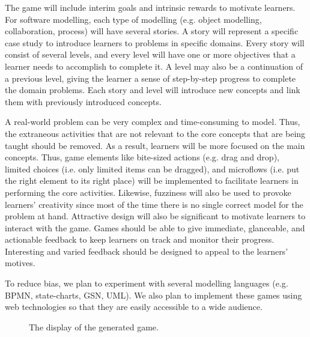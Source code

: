 \documentclass[12pt, a4paper]{report}
\begin{document}
The game will include interim goals and intrinsic rewards to motivate learners. For software modelling, each type of modelling (e.g. object modelling, collaboration, process) will have several stories. A story will represent a specific case study to introduce learners to problems in specific domains. Every story will consist of several levels, and every level will have one or more objectives that a learner needs to accomplish to complete it. A level may also be a continuation of a previous level, giving the learner a sense of step-by-step progress to complete the domain problems. Each story and level will introduce new concepts and link them with previously introduced concepts.

A real-world problem can be very complex and time-consuming to model. Thus, the extraneous activities that are not relevant to the core concepts that are being taught should be removed. As a result, learners will be more focused on the main concepts. Thus, game elements like bite-sized actions (e.g. drag and drop), limited choices (i.e. only limited items can be dragged), and microflows (i.e. put the right element to its right place) will be implemented to facilitate learners in performing the core activities. Likewise, fuzziness will also be used to provoke learners' creativity since most of the time there is no single correct model for the problem at hand. Attractive design will also be significant to motivate learners to interact with the game. Games should be able to give immediate, glanceable, and actionable feedback to keep learners on track and monitor their progress. Interesting and varied feedback should be designed to appeal to the learners' motives. 

To reduce bias, we plan to experiment with several modelling languages (e.g. BPMN, state-charts, GSN, UML). We also plan to implement these games using web technologies so that they are easily accessible to a wide audience.

\begin{figure}[ht]
\centering
{}
\caption{The display of the generated game.}
\label{fig:001}
\end{figure}
\end{document}
